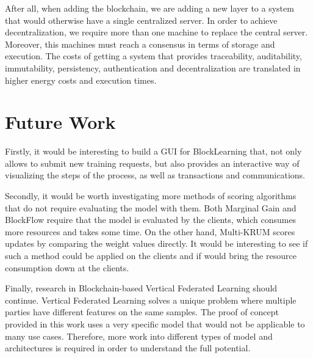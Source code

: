 After all, when adding the blockchain, we are adding a new layer to a system that would otherwise have a single centralized server. In order to achieve decentralization, we require more than one machine to replace the central server. Moreover, this machines must reach a consensus in terms of storage and execution. The costs of getting a system that provides traceability, auditability, immutability, persistency, authentication and decentralization are translated in higher energy costs and execution times.



\section{Future Work}\label{conclusions:future_work}

Firstly, it would be interesting to build a GUI for BlockLearning that, not only allows to submit new training requests, but also provides an interactive way of visualizing the steps of the process, as well as transactions and communications.

Secondly, it would be worth investigating more methods of scoring algorithms that do not require evaluating the model with them. Both Marginal Gain and BlockFlow require that the model is evaluated by the clients, which consumes more resources and takes some time. On the other hand, Multi-KRUM scores updates by comparing the weight values directly. It would be interesting to see if such a method could be applied on the clients and if would bring the resource consumption down at the clients.

Finally, research in Blockchain-based Vertical Federated Learning should continue. Vertical Federated Learning solves a unique problem where multiple parties have different features on the same samples. The proof of concept provided in this work uses a very specific model that would not be applicable to many use cases. Therefore, more work into different types of model and architectures is required in order to understand the full potential.
